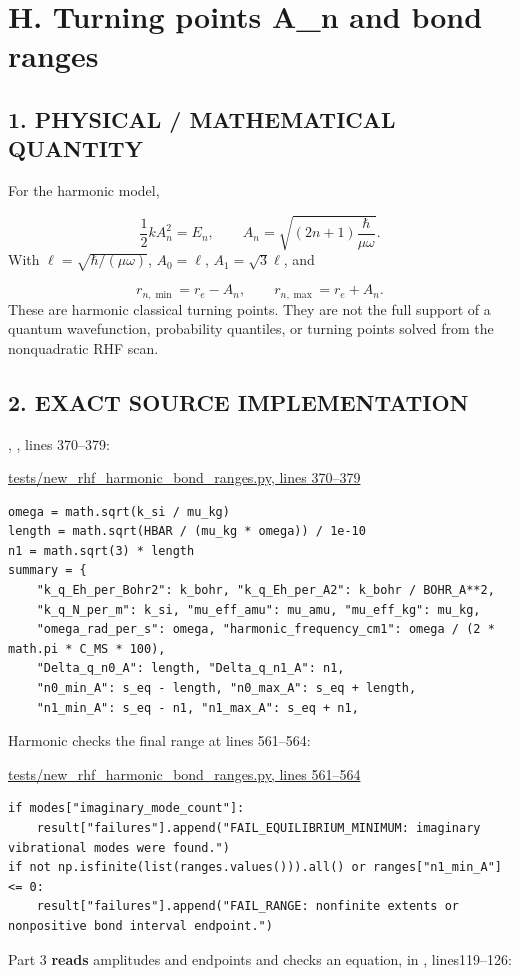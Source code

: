\documentclass[10pt,a4paper]{article}
\begin{document}
\clearpage
\section{H. Turning points A\_n and bond ranges}
\subsection{1. PHYSICAL / MATHEMATICAL QUANTITY}
For the harmonic model,

\[
\frac12kA_n^2=E_n,\qquad
A_n=\sqrt{(2n+1)\frac{\hbar}{\mu\omega}}.
\]
With \(\ell=\sqrt{\hbar/(\mu\omega)}\), \(A_0=\ell\), \(A_1=\sqrt3\ell\), and

\[
r_{n,\min}=r_e-A_n,\qquad r_{n,\max}=r_e+A_n.
\]
These are harmonic classical turning points. They are not the full support of a quantum wavefunction, probability quantiles, or turning points solved from the nonquadratic RHF scan.

\subsection{2. EXACT SOURCE IMPLEMENTATION}
, , lines 370–379:

\href{/Users/novaz/Desktop/qml2.0/tests/new\_rhf\_harmonic\_bond\_ranges.py:370}{tests/new\_rhf\_harmonic\_bond\_ranges.py, lines 370–379}

\begin{Verbatim}
omega = math.sqrt(k_si / mu_kg)
length = math.sqrt(HBAR / (mu_kg * omega)) / 1e-10
n1 = math.sqrt(3) * length
summary = {
    "k_q_Eh_per_Bohr2": k_bohr, "k_q_Eh_per_A2": k_bohr / BOHR_A**2,
    "k_q_N_per_m": k_si, "mu_eff_amu": mu_amu, "mu_eff_kg": mu_kg,
    "omega_rad_per_s": omega, "harmonic_frequency_cm1": omega / (2 * math.pi * C_MS * 100),
    "Delta_q_n0_A": length, "Delta_q_n1_A": n1,
    "n0_min_A": s_eq - length, "n0_max_A": s_eq + length,
    "n1_min_A": s_eq - n1, "n1_max_A": s_eq + n1,
\end{Verbatim}
Harmonic  checks the final range at lines 561–564:

\href{/Users/novaz/Desktop/qml2.0/tests/new\_rhf\_harmonic\_bond\_ranges.py:561}{tests/new\_rhf\_harmonic\_bond\_ranges.py, lines 561–564}

\begin{Verbatim}
if modes["imaginary_mode_count"]:
    result["failures"].append("FAIL_EQUILIBRIUM_MINIMUM: imaginary vibrational modes were found.")
if not np.isfinite(list(ranges.values())).all() or ranges["n1_min_A"] <= 0:
    result["failures"].append("FAIL_RANGE: nonfinite extents or nonpositive bond interval endpoint.")
\end{Verbatim}
Part 3 \textbf{reads} amplitudes and endpoints and checks an equation, in , lines119–126:
\end{document}
